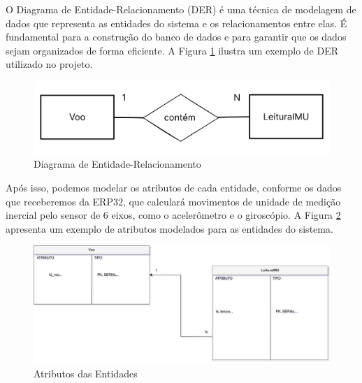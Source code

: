 \begin{samepage}

O Diagrama de Entidade-Relacionamento (DER) é uma técnica de modelagem de dados que representa as entidades do sistema e os relacionamentos entre elas. É fundamental para a construção do banco de dados e para garantir que os dados sejam organizados de forma eficiente. A Figura \ref{fig_der} ilustra um exemplo de DER utilizado no projeto.

\begin{figure}[H]
	\centering
	\includegraphics[width=15cm]{figuras/der.png}
	\caption{Diagrama de Entidade-Relacionamento}
	\label{fig_der}
\end{figure}

Após isso, podemos modelar os atributos de cada entidade, conforme os dados que receberemos da ERP32, que calculará movimentos de unidade de medição inercial pelo sensor de 6 eixos, como o acelerômetro e o giroscópio. A Figura \ref{fig_atributos} apresenta um exemplo de atributos modelados para as entidades do sistema.

\begin{figure}[H]
	\centering
	\includegraphics[width=15cm]{figuras/atributos.png}
	\caption{Atributos das Entidades}
	\label{fig_atributos}
\end{figure}

\end{samepage}


